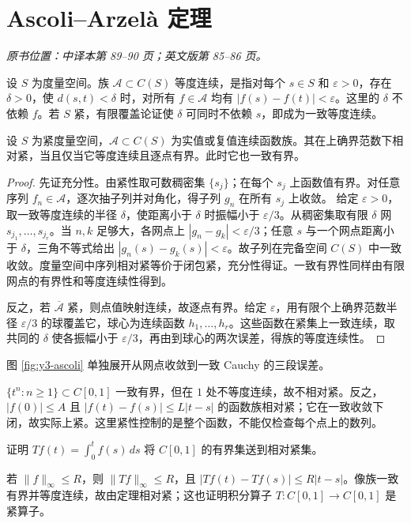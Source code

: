 \section{Ascoli--Arzel\`a 定理}\label{sec:yosida-03-03}
\noindent\textit{原书位置：中译本第 89--90 页；英文版第 85--86 页。}

\begin{definition}[等度连续]
设 $S$ 为度量空间。族 $\mathcal A\subset C(S)$ 等度连续，是指对每个 $s\in S$ 和 $\varepsilon>0$，存在 $\delta>0$，使 $d(s,t)<\delta$ 时，对所有 $f\in\mathcal A$ 均有 $|f(s)-f(t)|<\varepsilon$。这里的 $\delta$ 不依赖 $f$。若 $S$ 紧，有限覆盖论证使 $\delta$ 可同时不依赖 $s$，即成为一致等度连续。
\end{definition}

\begin{theorem}\label{thm:y3-ascoli}
设 $S$ 为紧度量空间，$\mathcal A\subset C(S)$ 为实值或复值连续函数族。其在上确界范数下相对紧，当且仅当它等度连续且逐点有界。此时它也一致有界。
\end{theorem}
\begin{proof}
先证充分性。由紧性取可数稠密集 $\{s_j\}$；在每个 $s_j$ 上函数值有界。对任意序列 $f_n\in\mathcal A$，逐次抽子列并对角化，得子列 $g_n$ 在所有 $s_j$ 上收敛。
给定 $\varepsilon>0$，取一致等度连续的半径 $\delta$，使距离小于 $\delta$ 时振幅小于 $\varepsilon/3$。从稠密集取有限 $\delta$ 网 $s_{j_1},\ldots,s_{j_r}$。当 $n,k$ 足够大，各网点上 $|g_n-g_k|<\varepsilon/3$；任意 $s$ 与一个网点距离小于 $\delta$，三角不等式给出 $|g_n(s)-g_k(s)|<\varepsilon$。故子列在完备空间 $C(S)$ 中一致收敛。度量空间中序列相对紧等价于闭包紧，充分性得证。一致有界性同样由有限网点的有界性和等度连续性得到。

反之，若 $\overline{\mathcal A}$ 紧，则点值映射连续，故逐点有界。给定 $\varepsilon$，用有限个上确界范数半径 $\varepsilon/3$ 的球覆盖它，球心为连续函数 $h_1,\ldots,h_r$。这些函数在紧集上一致连续，取共同的 $\delta$ 使各振幅小于 $\varepsilon/3$，再由到球心的两次误差，得族的等度连续性。
\end{proof}

图 \ref{fig:y3-ascoli} 单独展开从网点收敛到一致 Cauchy 的三段误差。



\begin{example}[有界性与紧性之间]
$\{t^n:n\ge1\}\subset C[0,1]$ 一致有界，但在 $1$ 处不等度连续，故不相对紧。反之，$|f(0)|\le A$ 且 $|f(t)-f(s)|\le L|t-s|$ 的函数族相对紧；它在一致收敛下闭，故实际上紧。这里紧性控制的是整个函数，不能仅检查每个点上的数列。
\end{example}

\begin{exercise}
证明 $Tf(t)=\int_0^t f(s)\,ds$ 将 $C[0,1]$ 的有界集送到相对紧集。
\end{exercise}
\begin{solution}
若 $\|f\|_\infty\le R$，则 $\|Tf\|_\infty\le R$，且 $|Tf(t)-Tf(s)|\le R|t-s|$。像族一致有界并等度连续，故由定理相对紧；这也证明积分算子 $T:C[0,1]\to C[0,1]$ 是紧算子。
\end{solution}
